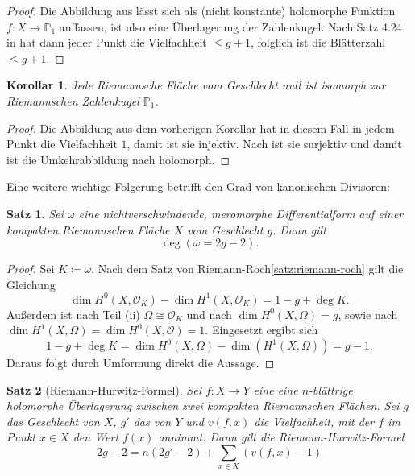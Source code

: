 \documentclass[11pt,a4paper]{scrartcl}
\theoremstyle{thm}
\newtheorem{satz}{Satz}[section]
\newtheorem{koro}{Korollar}[section]
\theoremstyle{def}
\theoremstyle{remark}
\begin{document}
\begin{proof}
	Die Abbildung aus  lässt sich als (nicht konstante) holomorphe Funktion $f:X\rightarrow \mathbb{P}_1$ auffassen\cite[S.8, Satz 1.15]{forster}, ist also eine Überlagerung der Zahlenkugel\cite[S.18, Satz 4.2]{forster}. Nach Satz 4.24 in \cite{forster} hat dann jeder Punkt die Vielfachheit $\leq g+1$, folglich ist die Blätterzahl $\leq g+1$.
	
\end{proof}
\begin{koro}
	Jede Riemannsche Fläche vom Geschlecht null ist isomorph zur Riemannschen Zahlenkugel $\mathbb{P}_1$.
\end{koro}
\begin{proof}
	Die Abbildung aus dem vorherigen Korollar hat in diesem Fall in jedem Punkt die Vielfachheit $1$, damit ist sie injektiv. Nach \cite[Satz 2.7]{forster} ist sie surjektiv und damit ist die Umkehrabbildung nach \cite[Korollar 2.5]{forster} holomorph. 
\end{proof}
Eine weitere wichtige Folgerung betrifft den Grad von kanonischen Divisoren:
\begin{satz}
	Sei $\omega$ eine nichtverschwindende, meromorphe Differentialform auf einer kompakten Riemannschen Fläche $X$ vom Geschlecht $g$. Dann gilt 
	\[\deg (\omega = 2g-2).
	\]
\end{satz}
\begin{proof}
		Sei $K\coloneqq \omega.$ Nach dem Satz von Riemann-Roch\ref{satz:riemann-roch} gilt die Gleichung
		\[
		\dim H^0(X,\mathcal{O}_K)-\dim H^1(X,\mathcal{O}_K)=1-g+\deg K.
		\]
		Außerdem ist nach  Teil (ii) $\Omega\cong\mathcal{O}_K$ und nach \cite[17.10]{forster} $\dim H^0(X,\Omega)=g$, sowie nach \cite[17.11]{forster} $\dim H^1(X,\Omega)=\dim H^0(X,\mathcal{O})=1$. Eingesetzt ergibt sich
		\[
		1-g+\deg K = \dim H^0(X,\Omega)-\dim(H^1(X,\Omega))=g-1.
		\]
		Daraus folgt durch Umformung direkt die Aussage.
\end{proof}
\begin{satz}[Riemann-Hurwitz-Formel]
	Sei $f:X\rightarrow Y$ eine eine $n$-blättrige holomorphe Überlagerung zwischen zwei kompakten Riemannschen Flächen. Sei $g$ das Geschlecht von $X$, $g'$ das von $Y$ und $v(f,x)$ die Vielfachheit, mit der $f$ im Punkt $x\in X$ den Wert $f(x)$ annimmt. Dann gilt die Riemann-Hurwitz-Formel
	\[
	2g-2=n(2g'-2)+\sum_{x\in X}\left(v(f,x)-1\right)
	\]
\end{satz}
\end{document}
